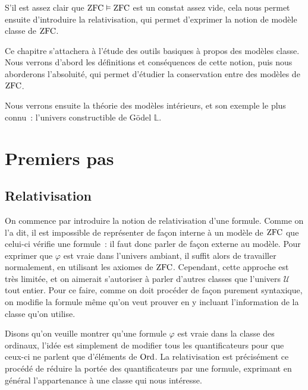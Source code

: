 S'il est assez clair que $\operatorname{ZFC}\vDash\operatorname{ZFC}$ est un constat assez vide, cela nous
permet ensuite d'introduire la relativisation, qui permet d'exprimer la notion
de modèle classe de $\operatorname{ZFC}$.

Ce chapitre s'attachera à l'étude des outils basiques à propos des modèles
classe. Nous verrons d'abord les définitions et conséquences de cette notion,
puis nous aborderons l'absoluité, qui permet d'étudier la conservation entre des
modèles de $\operatorname{ZFC}$.

Nous verrons ensuite la théorie des modèles intérieurs, et son exemple le plus
connu~: l'univers constructible de Gödel $\mathbb L$.

\section{Premiers pas}

\subsection{Relativisation}

On commence par introduire la notion de relativisation d'une formule. Comme on
l'a dit, il est impossible de représenter de façon interne à un modèle de $\operatorname{ZFC}$
que celui-ci vérifie une formule~: il faut donc parler de façon externe au
modèle. Pour exprimer que $\varphi$ est vraie dans l'univers ambiant, il suffit
alors de travailler normalement, en utilisant les axiomes de $\operatorname{ZFC}$. Cependant,
cette approche est très limitée, et on aimerait s'autoriser à parler d'autres
classes que l'univers $\mathcal U$ tout entier. Pour ce faire, comme on doit
procéder de façon purement syntaxique, on modifie la formule même qu'on veut
prouver en y incluant l'information de la classe qu'on utilise.

Disons qu'on veuille montrer qu'une formule $\varphi$ est vraie dans la classe
des ordinaux, l'idée est simplement de modifier tous les quantificateurs pour
que ceux-ci ne parlent que d'éléments de $\operatorname{Ord}$. La relativisation est
précisément ce procédé de réduire la portée des quantificateurs par une formule,
exprimant en général l'appartenance à une classe qui nous intéresse.

